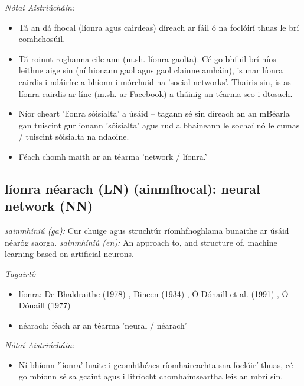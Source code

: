 \documentclass{article}
\begin{document}
 \noindent \textit{Nótaí Aistriúcháin:}
\begin{itemize}
	\item Tá an dá fhocal (líonra agus cairdeas) díreach ar fáil ó na foclóirí thuas le brí comhchosúil.
	\item Tá roinnt roghanna eile ann (m.sh. líonra gaolta). Cé go bhfuil brí níos leithne aige sin (ní hionann gaol agus gaol clainne amháin), is mar líonra cairdis i ndáiríre a bhíonn i mórchuid na 'social networks'. Thairis sin, is as líonra cairdis ar líne (m.sh. ar Facebook) a tháinig an téarma seo i dtosach.
	\item Níor cheart 'líonra sóisialta' a úsáid -- tagann sé sin díreach an an mBéarla gan tuiscint gur ionann 'sóisialta' agus rud a bhaineann le sochaí nó le cumas / tuiscint sóisialta na ndaoine.
	\item Féach chomh maith ar an téarma 'network / líonra.'
\end{itemize}


\subsection*{líonra néarach (LN) (ainmfhocal): neural network (NN)} 
 \noindent \textit{sainmhíniú (ga):} Cur chuige agus struchtúr ríomhfhoghlama bunaithe ar úsáid néaróg saorga.
\newline\newline
 \noindent \textit{sainmhíniú (en):} An approach to, and structure of, machine learning based on artificial neurons.
\newline

 \noindent \textit{Tagairtí:}
\begin{itemize}
	\item líonra: De Bhaldraithe (1978) \cite{de-bhaldraithe}, Dineen (1934) \cite{dineen}, Ó Dónaill et al. (1991) \cite{focloir-beag}, Ó Dónaill (1977) \cite{odonaill}
	\item néarach: féach ar an téarma 'neural / néarach'
\end{itemize}

 \noindent \textit{Nótaí Aistriúcháin:}
\begin{itemize}
	\item Ní bhíonn 'líonra' luaite i gcomhthéacs ríomhaireachta sna foclóirí thuas, cé go mbíonn sé sa gcaint agus i litríocht chomhaimseartha leis an mbrí sin.
\end{itemize}
\end{document}
